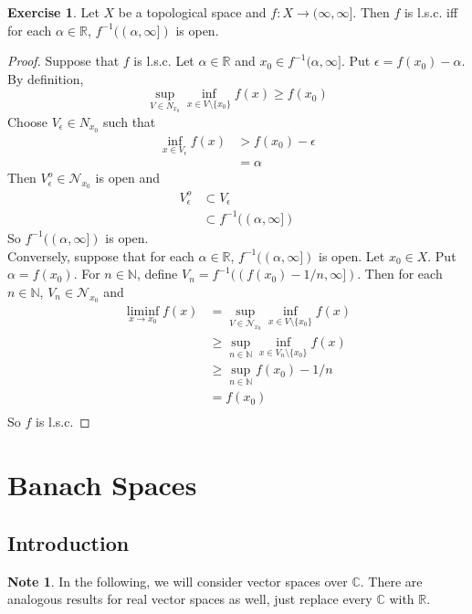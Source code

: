 \documentclass[12pt]{amsart}
\theoremstyle{definition}
\newtheorem{note}[definition]{Note}
\newtheorem{ex}[definition]{Exercise}
\newcommand{\al}{\alpha}
\newcommand{\ep}{\epsilon}
\newcommand{\C}{\mathbb{C}}
\newcommand{\N}{\mathbb{N}}
\newcommand{\R}{\mathbb{R}}
\newcommand{\MN}{\mathcal{N}}
\newcommand{\Ru}{(\infty, \infty]}
\newcommand{\lsc}{l.s.c. }
\begin{document}
	\begin{ex}
	Let $X$ be a topological space and $f: X \rightarrow \Ru$. Then $f$ is \lsc iff for each $\al \in \R$, $f^{-1}((\al, \infty])$ is open. 
	\end{ex}
	
	\begin{proof}
	Suppose that $f$ is \lsc Let $\al \in \R$ and $x_0 \in f^{-1}(\al, \infty]$. Put $\ep = f(x_0) - \al$. By definition, $$\sup_{V \in N_{x_0}} \inf_{x \in V \setminus \{x_0\}} f(x) \geq f(x_0)$$ Choose $V_{\ep} \in N_{x_0}$ such that 
	\begin{align*}
	\inf_{x \in V_{\ep}} f(x)  
	&> f(x_0) - \ep \\
	&= \al
\end{align*}
Then $V_{\ep}^o \in \MN_{x_0}$ is open and 
	\begin{align*}
		V_{\ep}^o 
		& \subset V_{\ep} \\
		&\subset f^{-1}((\al, \infty])
	\end{align*} 
	So $f^{-1}((\al, \infty])$ is open. \\
	Conversely, suppose that for each $\al \in \R$, $f^{-1}((\al, \infty])$ is open. Let $x_0 \in X$. Put $\al = f(x_0)$. For $n \in \N$, define $V_n = f^{-1}((f(x_0)-1/n, \infty]) $. Then for each $n \in \N$, $V_n \in \MN_{x_0}$ and 
	\begin{align*}
	\liminf_{x \rightarrow x_0} f(x) 
	&= \sup_{V \in \MN_{x_0}} \inf_{x \in V \setminus \{x_0\}} f(x) \\
	& \geq \sup_{n \in \N} \inf_{x \in V_n \setminus \{x_0\}} f(x) \\
	& \geq \sup_{n \in \N} f(x_0)-1/n \\
	&= f(x_0) \\
	\end{align*}
	So $f$ is \lsc
	\end{proof}
	
	
	
	
	
	
	
	
	
	
	
	
	
	
	
	
	\newpage
	\section{Banach Spaces}
	\subsection{Introduction}
	\begin{note}
		In the following, we will consider vector spaces over $\C$. There are analogous results for real vector spaces as well, just replace every $\C$ with $\R$.
	\end{note}
	
\end{document}
